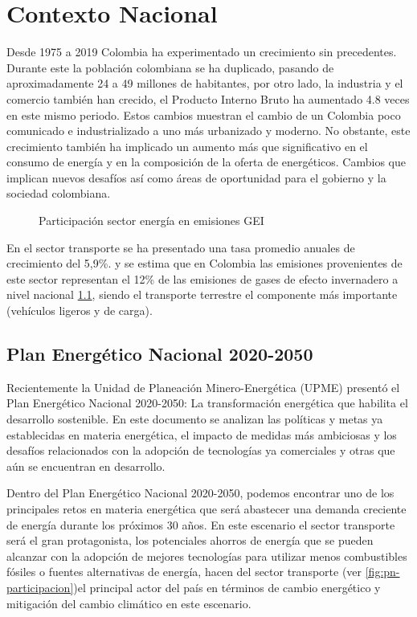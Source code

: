 \chapter{Contexto Nacional}

Desde 1975 a 2019 Colombia ha experimentado un crecimiento sin precedentes. Durante este la población colombiana se ha duplicado, pasando de aproximadamente 24 a 49 millones de habitantes, por otro lado, la industria y el comercio también han crecido, el Producto Interno Bruto ha aumentado 4.8 veces en este mismo periodo. Estos cambios muestran el cambio de un Colombia poco comunicado e industrializado a uno más urbanizado y moderno. \cite{Plan_Energetico-2050} No obstante, este crecimiento también ha implicado un aumento más que significativo en el consumo de energía y en la composición de la oferta de energéticos. Cambios que implican nuevos desafíos así como áreas de oportunidad para el gobierno y la sociedad colombiana. 

\begin{figure}[htbp]
   \centering
   
    \caption{Participación sector energía en emisiones GEI \cite{IDEAM_CO}}
    \label{fig:emisiones-transporte}
\end{figure}


En el sector transporte se ha presentado una tasa promedio anuales de crecimiento del  5,9\%. \cite{Plan_Energetico-2050} y se estima que en Colombia las emisiones provenientes de este sector representan el 12\% de las emisiones de gases de efecto invernadero a nivel nacional \ref{fig:emisiones-transporte}, siendo el transporte terrestre el componente más importante (vehículos ligeros y de carga). \cite{IDEAM_CO}

\section{Plan Energético Nacional 2020-2050}

Recientemente la Unidad de Planeación Minero-Energética (UPME) presentó el Plan Energético Nacional 2020-2050: La transformación energética que habilita el desarrollo sostenible. En este documento se analizan las políticas y metas ya establecidas en materia energética, el impacto de medidas más ambiciosas y los desafíos relacionados con la adopción de tecnologías ya comerciales y otras que aún se encuentran en desarrollo.

Dentro del Plan Energético Nacional 2020-2050, podemos encontrar uno de los principales retos en materia energética que será abastecer una demanda creciente de energía durante los próximos 30 años. En este escenario el sector transporte será el gran protagonista, los potenciales ahorros de energía que se pueden alcanzar con la adopción de mejores tecnologías para utilizar menos combustibles fósiles o fuentes alternativas de energía, hacen del sector transporte (ver \ref{fig:pn-participacion})el principal actor del país en términos de cambio energético y mitigación del cambio climático en este escenario. \cite{Plan_Energetico-2050}

